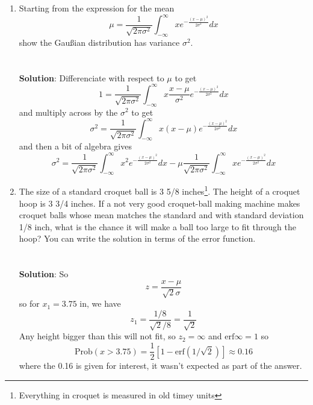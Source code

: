 \documentclass[11pt,a4paper]{scrartcl}
\begin{document}
\begin{enumerate}
\item Starting from the expression for the mean
  \begin{equation}
    \mu=\frac{1}{\sqrt{2\pi\sigma^2}}\int_{-\infty}^\infty xe^{-\frac{(x-\mu)^2}{2\sigma^2}}dx
  \end{equation}
  show the Gau\ss{}ian distribution has variance $\sigma^2$.
\\ \\ \\
\textbf{Solution}: Differenciate with respect to $\mu$ to get
\begin{equation}
  1=\frac{1}{\sqrt{2\pi\sigma^2}}\int_{-\infty}^\infty x\frac{x-\mu}{\sigma^2}e^{-\frac{(x-\mu)^2}{2\sigma^2}}dx
\end{equation}
and multiply across by the $\sigma^2$ to get
\begin{equation}
  \sigma^2=\frac{1}{\sqrt{2\pi\sigma^2}}\int_{-\infty}^\infty x(x-\mu)e^{-\frac{(x-\mu)^2}{2\sigma^2}}dx
\end{equation}
and then a bit of algebra gives
\begin{equation}
  \sigma^2=\frac{1}{\sqrt{2\pi\sigma^2}}\int_{-\infty}^\infty x^2e^{-\frac{(x-\mu)^2}{2\sigma^2}}dx-\mu\frac{1}{\sqrt{2\pi\sigma^2}}\int_{-\infty}^\infty xe^{-\frac{(x-\mu)^2}{2\sigma^2}}dx
\end{equation}

\item The size of a standard croquet ball is 3 5/8
  inches\footnote{Everything in croquet is measured in old timey
    units}. The height of a croquet hoop is 3 3/4 inches. If a not
  very good croquet-ball making machine makes croquet balls whose mean
  matches the standard and with standard deviation 1/8 inch, what is
  the chance it will make a ball too large to fit through the hoop?
  You can write the solution in terms of the error function.
  \\ \\ \\ \textbf{Solution}: So
\begin{equation}
z=\frac{x-\mu}{\sqrt{2}\sigma}
\end{equation}
so for $x_1=3.75$ in, we have
\begin{equation}
z_1=\frac{1/8}{\sqrt{2}/8}=\frac{1}{\sqrt{2}}
\end{equation}
Any height bigger than this will not fit, so $z_2=\infty$ and $\mbox{erf}{\infty}=1$ so
\begin{equation}
\mbox{Prob}(x>3.75)=\frac{1}{2}[1-\mbox{erf}(1/\sqrt{2})]\approx 0.16
\end{equation}
where the 0.16 is given for interest, it wasn't expected as part of the answer.

  

\end{enumerate}
\end{document}
